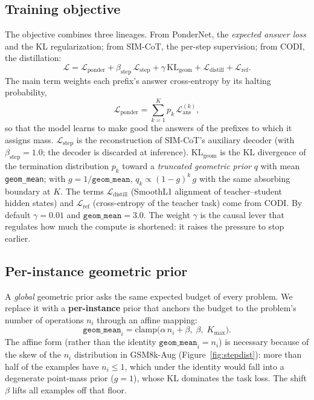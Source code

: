 \documentclass[11pt]{article}
\begin{document}
\subsection{Training objective}
\label{sec:loss}

The objective combines three lineages. From PonderNet, the \emph{expected answer loss} and the KL regularization; from SIM-CoT, the per-step supervision; from CODI, the distillation:
\begin{equation}
  \mathcal{L} = \mathcal{L}_{\text{ponder}}
  + \beta_{\text{step}}\,\mathcal{L}_{\text{step}}
  + \gamma\,\mathrm{KL}_{\text{geom}}
  + \mathcal{L}_{\text{distill}}
  + \mathcal{L}_{\text{ref}} .
  \label{eq:loss}
\end{equation}
The main term weights each prefix's answer cross-entropy by its halting probability,
\begin{equation}
  \mathcal{L}_{\text{ponder}}
  = \sum_{k=1}^{K} p_k \, \mathcal{L}_{\text{ans}}^{(k)} ,
  \label{eq:lponder}
\end{equation}
so that the model learns to make good the answers of the prefixes to which it assigns mass. $\mathcal{L}_{\text{step}}$ is the reconstruction of SIM-CoT's auxiliary decoder (with $\beta_{\text{step}}=1.0$; the decoder is discarded at inference). $\mathrm{KL}_{\text{geom}}$ is the KL divergence of the termination distribution $p_k$ toward a \emph{truncated geometric prior} $q$ with mean \texttt{geom\_mean}; with $g = 1/\texttt{geom\_mean}$, $q_k \propto (1-g)^{k}\,g$ with the same absorbing boundary at $K$. The terms $\mathcal{L}_{\text{distill}}$ (SmoothL1 alignment of teacher--student hidden states) and $\mathcal{L}_{\text{ref}}$ (cross-entropy of the teacher task) come from CODI. By default $\gamma=0.01$ and $\texttt{geom\_mean}=3.0$. The weight $\gamma$ is the causal lever that regulates how much the compute is shortened: it raises the pressure to stop earlier.

\subsection{Per-instance geometric prior}
\label{sec:prior}

A \emph{global} geometric prior asks the same expected budget of every problem. We replace it with a \textbf{per-instance} prior that anchors the budget to the problem's number of operations $n_i$ through an affine mapping:
\begin{equation}
  \texttt{geom\_mean}_i = \mathrm{clamp}\big(\alpha\, n_i + \beta,\; \beta,\; K_{\max}\big).
  \label{eq:adaptiveprior}
\end{equation}
The affine form (rather than the identity $\texttt{geom\_mean}_i = n_i$) is necessary because of the skew of the $n_i$ distribution in GSM8k-Aug (Figure~\ref{fig:stepdist}): more than half of the examples have $n_i \le 1$, which under the identity would fall into a degenerate point-mass prior ($g=1$), whose KL dominates the task loss. The shift $\beta$ lifts all examples off that floor.
\end{document}
